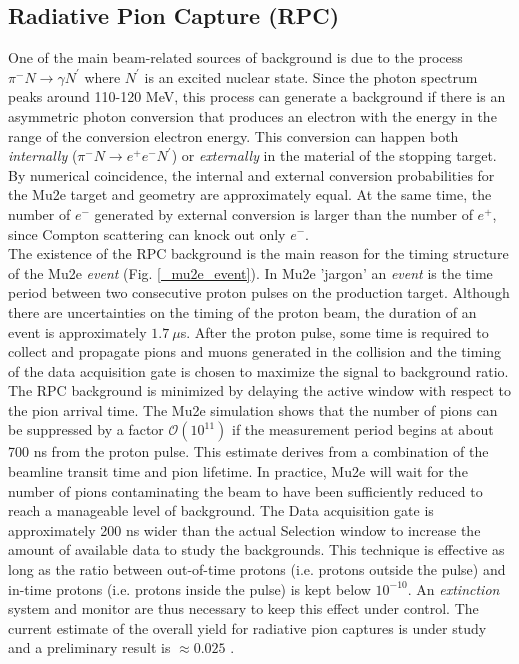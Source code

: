 \documentclass[12pt,a4paper,openright, oneside, titlepage]{book} %
\begin{document}
\subsection{Radiative Pion Capture (RPC)}
One of the main beam-related sources of background is due to the process
$\pi^- N \rightarrow \gamma N^\prime$ where $N^\prime$ is an excited nuclear state. 
Since the photon spectrum peaks around 110-120 MeV, this process can generate
a background if there is an asymmetric photon conversion that produces
an electron with the energy in the range of the conversion electron energy. 
This conversion can happen both \textit{internally} ($\pi^- N \rightarrow e^+e^- N^\prime$) or \textit{externally}
in the material of the stopping target.
By numerical coincidence, the internal and external conversion probabilities for the Mu2e target and geometry are approximately equal. 
At the same time, the number of $e^-$ generated by external conversion is larger than the number of $e^+$, 
since Compton scattering can knock out only $e^-$.\\
The existence of the RPC background is the main reason for the timing structure of the Mu2e \textit{event} (Fig. \ref{_mu2e_event}). 
In Mu2e 'jargon' an \textit{event}  is the time period between two consecutive proton pulses on the production target. 
Although there are  uncertainties on the timing of the proton beam, 
the duration of an event is approximately $1.7\ \mu$s. 
After the proton pulse, some time is required to collect and propagate pions and muons generated in the collision 
and the timing of the data acquisition gate is chosen to maximize the signal to background ratio.
The RPC background is minimized by delaying the active window
with respect to the pion arrival time. 
The Mu2e simulation shows that the number of pions can be suppressed 
by a factor $\mathcal{O}(10^{11})$ 
if the measurement period begins at about 700 ns from the proton pulse.
This estimate derives from a combination of the beamline transit time 
and pion lifetime.
In practice, Mu2e will wait for the number of pions contaminating the beam 
to have been sufficiently reduced to reach a manageable level of background.
The Data acquisition gate is approximately 200 ns wider than the actual Selection window
to increase the amount of available data to study the backgrounds.
This technique is effective as long as the ratio between out-of-time protons 
(i.e. protons outside the pulse) and in-time protons (i.e. protons inside the pulse)
is kept below $10^{-10}$. 
An \textit{extinction} system and monitor are thus necessary to keep this effect
under control.
The current estimate of the overall yield for radiative pion captures is under study 
and a preliminary result is $\approx 0.025$ \cite{RPC_now}.
\end{document}
